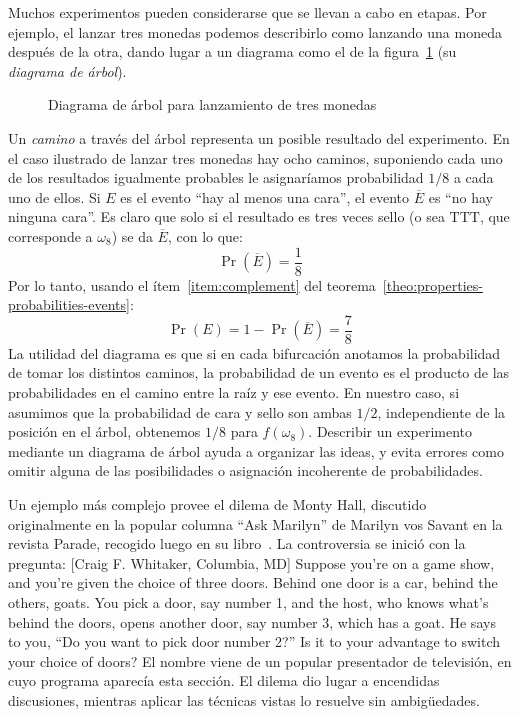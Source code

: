   Muchos experimentos
  pueden considerarse que se llevan a cabo en etapas.
  Por ejemplo,
  el lanzar tres monedas podemos describirlo
  como lanzando una moneda después de la otra,
  dando lugar a un diagrama
  como el de la figura~\ref{fig:event-tree}
  (su \emph{diagrama de árbol}).
  \begin{figure}[ht]
    \centering
    \caption{Diagrama de árbol para lanzamiento de tres monedas}
    \label{fig:event-tree}
  \end{figure}
  Un \emph{camino}
  a través del árbol representa un posible resultado
  del experimento.
  En el caso ilustrado de lanzar tres monedas
  hay ocho caminos,
  suponiendo cada uno de los resultados igualmente probables
  le asignaríamos probabilidad \(1 / 8\) a cada uno de ellos.
  Si \(E\) es el evento ``hay al menos una cara'',
  el evento \(\overline{E}\) es ``no hay ninguna cara''.
  Es claro que solo si el resultado es tres veces sello
  (o sea \(\mathrm{TTT}\),
   que corresponde a \(\omega_8\))
  se da \(\overline{E}\),
  con lo que:
  \begin{equation*}
    \Pr(\overline{E})
      = \frac{1}{8}
  \end{equation*}
  Por lo tanto,
  usando el ítem~\ref{item:complement}
  del teorema~\ref{theo:properties-probabilities-events}:
  \begin{equation*}
    \Pr(E)
      = 1 - \Pr(\overline{E})
      = \frac{7}{8}
  \end{equation*}
  La utilidad del diagrama es que si en cada bifurcación
  anotamos la probabilidad de tomar los distintos caminos,
  la probabilidad de un evento es el producto de las probabilidades
  en el camino entre la raíz y ese evento.
  En nuestro caso,
  si asumimos
  que la probabilidad de cara y sello son ambas \(1 / 2\),
  independiente de la posición en el árbol,
  obtenemos \(1 / 8\) para \(f(\omega_8)\).
  Describir un experimento mediante un diagrama de árbol
  ayuda a organizar las ideas,
  y evita errores como omitir alguna de las posibilidades
  o asignación incoherente de probabilidades.

  Un ejemplo más complejo provee el dilema de Monty Hall,%
  discutido originalmente
  en la popular columna ``Ask Marilyn'' de Marilyn vos Savant
  en la revista \foreignlanguage{english}{Parade},
  recogido luego en su libro~\cite{savant97:_power_logic_thinking}.
  La controversia se inició con la pregunta:
     [Craig F. Whitaker,
      Columbia, MD]{%
     Suppose you're on a game show,
     and you're given the choice of three doors.
     Behind one door is a car,
     behind the others,
     goats.
     You pick a door,
     say number 1,
     and the host,
     who knows what's behind the doors,
     opens another door,
     say number 3,
     which has a goat.
     He says to you,
     ``Do you want to pick door number 2?''
     Is it to your advantage to switch your choice of doors?
  }
  El nombre viene de un popular presentador de televisión,
  en cuyo programa aparecía esta sección.
  El dilema dio lugar a encendidas discusiones,
  mientras aplicar las técnicas vistas lo resuelve sin ambigüedades.

